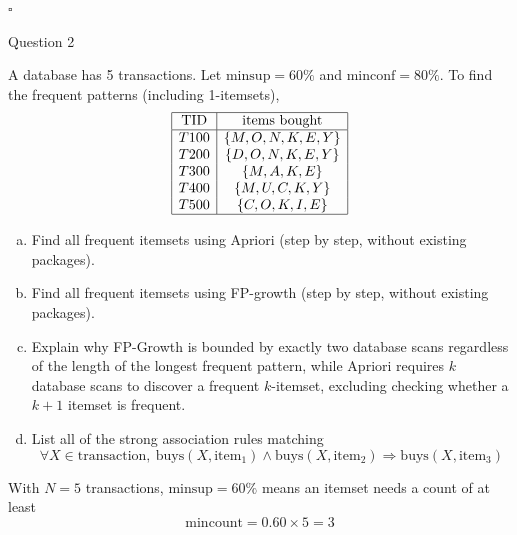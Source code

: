 \documentclass[12pt,letterpaper, onecolumn]{exam}
\newcommand{\minsup}{\mathrm{minsup}}
\newcommand{\minconf}{\mathrm{minconf}}
\newcommand{\mincount}{\mathrm{mincount}}
\begin{document}
\begin{questions}
\begin{solution}
        $\square$
    \end{solution}

    \newpage
    \question Question 2

    A database has 5 transactions. Let $\minsup = 60\%$ and $\minconf = 80\%$. To find the frequent patterns (including 1-itemsets),
    \begin{equation*}
        \begin{array}{|c|c|}
            \hline \text{TID} & \text{items bought} \\ \hline
            T100 & \{M, O, N, K, E, Y\} \\
            T200 & \{D, O, N, K, E, Y\} \\
            T300 & \{M, A, K, E\} \\
            T400 & \{M, U, C, K, Y\} \\
            T500 & \{C, O, K, I, E\} \\ \hline
        \end{array}
    \end{equation*}
    \begin{enumerate}[a.)]
        \item Find all frequent itemsets using Apriori (step by step, without existing packages).
        \item Find all frequent itemsets using FP-growth (step by step, without existing packages).
        \item Explain why FP-Growth is bounded by exactly two database scans regardless of the length of the longest frequent pattern, while Apriori requires $k$ database scans to discover a frequent $k$-itemset, excluding checking whether a $k+1$ itemset is frequent.
        \item List all of the strong association rules matching
        \begin{equation*}
            \forall X\in\text{transaction},\ \text{buys}(X,\text{item}_1)\wedge\text{buys}(X,\text{item}_2)\Rightarrow\text{buys}(X,\text{item}_3)
        \end{equation*}
    \end{enumerate}

    \begin{solution}

        With $N=5$ transactions, $\minsup=60\%$ means an itemset needs a count of at least
        \begin{equation*}
            \mincount = 0.60\times 5 = 3
        \end{equation*}


\end{solution}
\end{questions}
\end{document}
